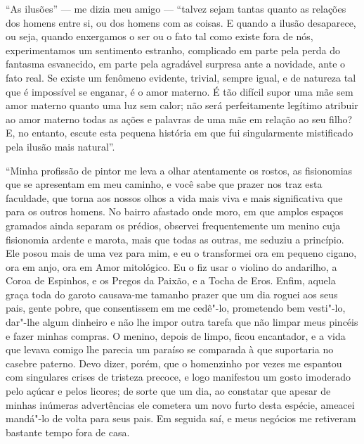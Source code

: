 “As ilusões'' --- me dizia meu amigo --- “talvez sejam
tantas quanto as relações dos homens entre si, ou dos homens com as
coisas. E quando a ilusão desaparece, ou seja, quando enxergamos o ser
ou o fato tal como existe fora de nós, experimentamos um sentimento
estranho, complicado em parte pela perda do fantasma esvanecido, em
parte pela agradável surpresa ante a novidade, ante o fato real.
Se existe um fenômeno evidente, trivial, sempre igual, e de natureza
tal que é impossível se enganar, é o amor materno. É tão difícil supor
uma mãe sem amor materno quanto uma luz sem calor; não será
perfeitamente legítimo atribuir ao amor materno todas as ações e
palavras de uma mãe em relação ao seu filho? E, no entanto, escute esta
pequena história em que fui singularmente mistificado pela ilusão mais
natural''.

“Minha profissão de pintor me leva a olhar atentamente os
rostos, as fisionomias que se apresentam em meu caminho, e você sabe que
prazer nos traz esta faculdade, que torna aos nossos olhos a vida mais
viva e mais significativa que para os outros homens. No bairro afastado
onde moro, em que amplos espaços gramados ainda separam os prédios,
observei frequentemente um menino cuja fisionomia ardente e marota,
mais que todas as outras, me seduziu a princípio. Ele posou mais de
uma vez para mim, e eu o transformei ora em pequeno cigano, ora em
anjo, ora em Amor mitológico. Eu o fiz usar o violino do andarilho, a
Coroa de Espinhos, e os Pregos da Paixão, e a Tocha de Eros. Enfim,
aquela graça toda do garoto causava-me tamanho prazer que 
um dia roguei aos seus pais, gente pobre, que consentissem em me cedê"-lo,
prometendo bem vesti"-lo, dar"-lhe algum dinheiro e não lhe impor 
outra tarefa que não limpar meus pincéis e fazer minhas compras. O
menino, depois de limpo, ficou encantador, e a vida que levava
comigo lhe parecia um paraíso se comparada à que suportaria no casebre
paterno. Devo dizer, porém, que o homenzinho por vezes me espantou com
singulares crises de tristeza precoce, e logo manifestou um gosto
imoderado pelo açúcar e pelos licores; de sorte que um dia, ao constatar que apesar de minhas inúmeras advertências ele cometera
um novo furto desta espécie, ameacei mandá"-lo de volta para seus pais.
Em seguida saí, e meus negócios me retiveram bastante tempo fora de
casa.

